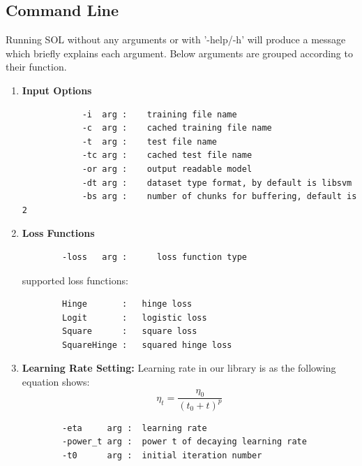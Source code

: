 \documentclass[11pt,a4paper]{article}
\newlength{\wideitemsep}
\let\olditem\item
\renewcommand{\item}{\setlength{\itemsep}{\wideitemsep}\olditem}
\begin{document}
\subsection{Command Line}
Running SOL without any arguments or with '-help/-h' will produce a message which briefly explains each argument. Below arguments are grouped according to their function.

\begin{enumerate}
    \item \textbf{Input Options}
        \begin{lstlisting}
            -i  arg :    training file name
            -c  arg :    cached training file name
            -t  arg :    test file name
            -tc arg :    cached test file name
            -or arg :    output readable model
            -dt arg :    dataset type format, by default is libsvm 
            -bs arg :    number of chunks for buffering, default is 2
        \end{lstlisting}

    \item \textbf{Loss Functions}
        \begin{lstlisting}
        -loss   arg :      loss function type
        \end{lstlisting}

        supported loss functions: 
        \begin{lstlisting}
        Hinge       :   hinge loss
        Logit       :   logistic loss
        Square      :   square loss
        SquareHinge :   squared hinge loss
        \end{lstlisting}

    \item \textbf{Learning Rate Setting:} Learning rate in our library is as the following equation shows:
        \begin{equation}
            \eta_t=\frac{\eta_0}{(t_0+t)^p}
            \label{equ:lrate}
        \end{equation}

        
        \begin{lstlisting}
        -eta     arg :  learning rate
        -power_t arg :  power t of decaying learning rate
        -t0      arg :  initial iteration number
        \end{lstlisting}


\end{enumerate}
\end{document}

